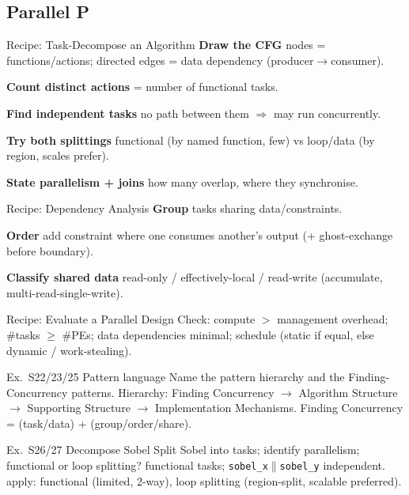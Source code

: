 \subsection{Parallel P}

\begin{KR}{Recipe: Task-Decompose an Algorithm}
    \textbf{Draw the CFG} nodes = functions/actions; directed edges = data dependency (producer$\to$consumer).

    \textbf{Count distinct actions} = number of functional tasks.

    \textbf{Find independent tasks} no path between them $\Rightarrow$ may run concurrently.

    \textbf{Try both splittings} functional (by named function, few) vs loop/data (by region, scales prefer).

    \textbf{State parallelism + joins} how many overlap, where they synchronise.
\end{KR}

\begin{KR}{Recipe: Dependency Analysis}
    \textbf{Group} tasks sharing data/constraints.

    \textbf{Order} add constraint where one consumes another's output (+ ghost-exchange before boundary).
    
    \textbf{Classify shared data} read-only / effectively-local / read-write (accumulate, multi-read-single-write).
\end{KR}



\begin{KR}{Recipe: Evaluate a Parallel Design}
    Check: compute $>$ management overhead; \#tasks $\geq$ \#PEs; data dependencies minimal; schedule (static if equal, else dynamic / work-stealing).
\end{KR}







\begin{example2}{Ex.\ S22/23/25 Pattern language}
    Name the pattern hierarchy and the Finding-Concurrency patterns.
    \tcblower
    Hierarchy: Finding Concurrency $\to$ Algorithm Structure $\to$ Supporting Structure $\to$ Implementation Mechanisms. Finding Concurrency =  (task/data) +  (group/order/share).
\end{example2}

\begin{example2}{Ex.\ S26/27 Decompose Sobel}
    Split Sobel into tasks; identify parallelism; functional or loop splitting?
     functional tasks; \texttt{sobel\_x}$\parallel$\texttt{sobel\_y} independent.  apply: functional (limited, 2-way), loop splitting (region-split, scalable preferred).
\end{example2}

